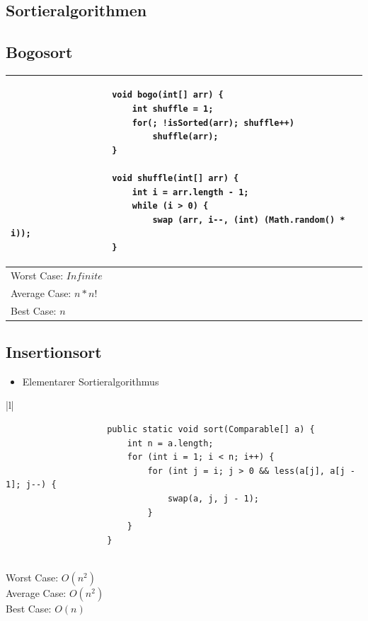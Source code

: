 \documentclass[a4paper, landscape, 8pt]{scrartcl}
\begin{document}
\begin{multicols*}{4}
        \section{Sortieralgorithmen}
            \subsection{Bogosort}
                \begin{tabular}{|l|}
                    \hline
                    \begin{lstlisting}
                    void bogo(int[] arr) {
                        int shuffle = 1;
                        for(; !isSorted(arr); shuffle++)
                            shuffle(arr);
                    }

                    void shuffle(int[] arr) {
                        int i = arr.length - 1;
                        while (i > 0) {
                            swap (arr, i--, (int) (Math.random() * i));
                    }
                    \end{lstlisting} \\
                    \hline
                    Worst Case: $Infinite$ \\
                    Average Case: $n*n!$ \\
                    Best Case: $n$ \\
                    \hline
                \end{tabular}

            \subsection{Insertionsort}
                \begin{itemize}
                    \item Elementarer Sortieralgorithmus
                \end{itemize}
                \begin{tabular}{|l|}
                    \hline
                    \begin{lstlisting}
                    public static void sort(Comparable[] a) {
                        int n = a.length;
                        for (int i = 1; i < n; i++) {
                            for (int j = i; j > 0 && less(a[j], a[j - 1]; j--) {
                                swap(a, j, j - 1);
                            }
                        }
                    }
                    \end{lstlisting} \\
                    \hline
                    Worst Case: $O(n^2)$ \\
                    Average Case: $O(n^2)$ \\
                    Best Case: $O(n)$ \\
                    \hline
                \end{tabular}


\end{multicols*}
\end{document}
